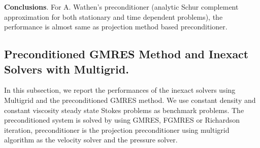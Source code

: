 \documentclass[9pt]{article}
\begin{document}
{\bf Conclusions}. For A. Wathen's preconditioner (analytic Schur complement approximation for both stationary and time dependent problems), the performance is almost same as projection method based preconditioner.

\subsection{Preconditioned GMRES Method and Inexact Solvers with Multigrid.}

In this subsection, we report the performances of the inexact solvers using Multigrid and the preconditioned GMRES method. We use constant density and constant viscosity steady state Stokes problems as benchmark problems. The preconditioned system is solved by using GMRES, FGMRES or Richardson iteration, preconditioner is the projection preconditioner using multigrid algorithm as the velocity solver and the pressure solver.
\end{document}
